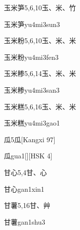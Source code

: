 \begin{entry}{玉米笋}{5,6,10}{⽟、⽶、⽵}
  \begin{phonetics}{玉米笋}{yu4mi3sun3}
  \end{phonetics}
\end{entry}

\begin{entry}{玉米粉}{5,6,10}{⽟、⽶、⽶}
  \begin{phonetics}{玉米粉}{yu4mi3fen3}
  \end{phonetics}
\end{entry}

\begin{entry}{玉米糁}{5,6,14}{⽟、⽶、⽶}
  \begin{phonetics}{玉米糁}{yu4mi3san3}
  \end{phonetics}
\end{entry}

\begin{entry}{玉米糕}{5,6,16}{⽟、⽶、⽶}
  \begin{phonetics}{玉米糕}{yu4mi3gao1}
  \end{phonetics}
\end{entry}

\begin{entry}{瓜}{5}{⽠}[Kangxi 97]
  \begin{phonetics}{瓜}{gua1}[][HSK 4]
  \end{phonetics}
\end{entry}

\begin{entry}{甘心}{5,4}{⽢、⼼}
  \begin{phonetics}{甘心}{gan1xin1}
  \end{phonetics}
\end{entry}

\begin{entry}{甘薯}{5,16}{⽢、⾋}
  \begin{phonetics}{甘薯}{gan1shu3}
  \end{phonetics}
\end{entry}

